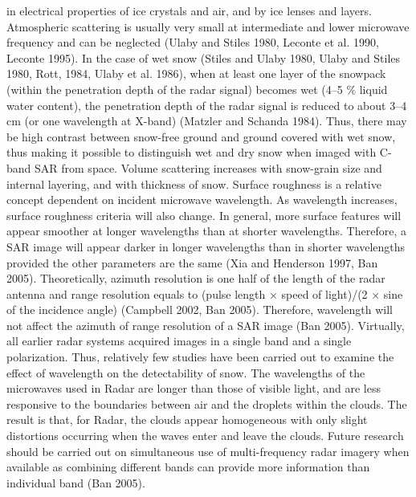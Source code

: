 in electrical properties of ice crystals and air, and by ice lenses and layers. Atmospheric scattering is usually very small at intermediate and lower microwave frequency and can be neglected (Ulaby and Stiles 1980, Leconte et al. 1990, Leconte 1995). In the case of wet snow (Stiles and Ulaby 1980, Ulaby and Stiles 1980, Rott, 1984, Ulaby et al. 1986), when at least one layer of the snowpack (within the penetration depth of the radar signal) becomes wet (4–5 $\%$ liquid water content), the penetration depth of the radar signal is reduced to about 3–4 cm (or one wavelength at X-band) (Matzler and Schanda 1984). Thus, there may be high contrast between snow-free ground and ground covered with wet snow, thus making it possible to distinguish wet and dry snow when imaged with C-band SAR from space. Volume scattering increases with snow-grain size and internal layering, and with thickness of snow. Surface roughness is a relative concept dependent on incident microwave wavelength. As wavelength increases, surface roughness criteria will also change. In general, more surface features will appear smoother at longer wavelengths than at shorter wavelengths. Therefore, a SAR image will appear darker in longer wavelengths than in shorter wavelengths provided the other parameters are the same (Xia and Henderson 1997, Ban 2005). Theoretically, azimuth resolution is one half of the length of the radar antenna and range resolution equals to (pulse length × speed of light)/(2 × sine of the incidence angle) (Campbell 2002, Ban 2005). Therefore, wavelength will not affect the azimuth of range resolution of a SAR image (Ban 2005). Virtually, all earlier radar systems acquired images in a single band and a single polarization. Thus, relatively few studies have been carried out to examine the effect of wavelength on the detectability of snow. The wavelengths of the microwaves used in Radar are longer than those of visible light, and are less responsive to the boundaries between air and the droplets within the clouds. The result is that, for Radar, the clouds appear homogeneous with only slight distortions occurring when the waves enter and leave the clouds. Future research should be carried out on simultaneous use of multi-frequency radar imagery when available as combining different bands can provide more information than individual band (Ban 2005).
